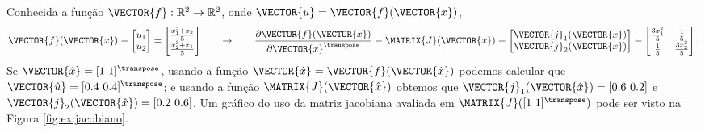 \begin{example}
Conhecida a função $\VECTOR{f}: \mathbb{R}^2 \rightarrow \mathbb{R}^2$,
onde $\VECTOR{u}=\VECTOR{f}(\VECTOR{x})$, 
\begin{equation}
\VECTOR{f}(\VECTOR{x})\equiv 
\begin{bmatrix}
u_1\\
u_2
\end{bmatrix}
=
\begin{bmatrix}
\frac{x_1^3+x_2}{5}\\
\frac{x_2^3+x_1}{5}
\end{bmatrix}
\qquad \rightarrow \qquad
\frac{\partial \VECTOR{f}(\VECTOR{x}) }{\partial \VECTOR{x}^{\transpose}}\equiv
\MATRIX{J}(\VECTOR{x})\equiv
\begin{bmatrix}
\VECTOR{j}_{1}(\VECTOR{x})\\
\VECTOR{j}_{2}(\VECTOR{x})
\end{bmatrix}\equiv
\begin{bmatrix}
\frac{3 x_1^2}{5} & \frac{1}{5}\\
\frac{1}{5}       & \frac{3 x_2^2}{5}
\end{bmatrix}.
\end{equation}
Se $\VECTOR{\hat{x}}=[1~ 1]^{\transpose}$, usando a função $\VECTOR{\hat{x}}=\VECTOR{f}(\VECTOR{\hat{x}})$ 
podemos calcular que $\VECTOR{\hat{u}}=[0.4~ 0.4]^{\transpose}$;
e usando a função $\MATRIX{J}(\VECTOR{\hat{x}})$ obtemos que 
$\VECTOR{j}_{1}(\VECTOR{\hat{x}})=[0.6~ 0.2]$ e $\VECTOR{j}_{2}(\VECTOR{\hat{x}})=[0.2~ 0.6]$.
Um gráfico do uso da matriz jacobiana avaliada em $\MATRIX{J}([1~ 1]^{\transpose})$ pode ser visto na Figura \ref{fig:ex:jacobiano}.
\end{example}

